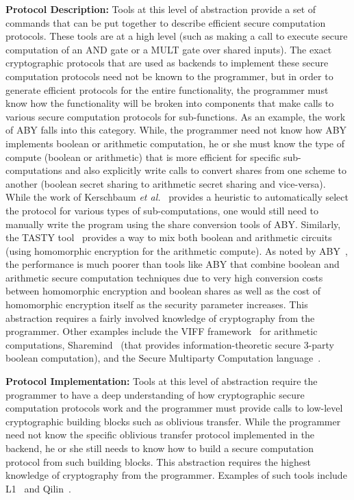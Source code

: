 \begin{tiret}
\item {\bf Protocol Description:} Tools at this level of abstraction provide a set of commands that can be put together to describe efficient secure computation protocols. These tools are at a high level (such as making a call to execute secure computation of an AND gate or a MULT gate over shared inputs). The exact cryptographic protocols that are used as backends to implement these secure computation protocols need not be known to the programmer, but in order to generate efficient protocols for the entire functionality, the programmer must know how the functionality will be broken into components that make calls to various secure computation protocols for sub-functions. As an example, the work of ABY \cite{aby} falls into this category. While, the programmer need not know how ABY implements boolean or arithmetic computation, he or she must know the type of compute (boolean or arithmetic) that is more efficient for specific sub-computations and also explicitly write calls to convert shares from one scheme to another (boolean secret sharing to arithmetic secret sharing and vice-versa). While the work of Kerschbaum {\em et al.}~\cite{kos14} provides a heuristic to automatically select the protocol for various types of sub-computations, one would still need to manually write the program using the share conversion tools of ABY. Similarly, the TASTY tool~\cite{tasty} provides a way to mix both boolean and arithmetic circuits (using homomorphic encryption for the arithmetic compute). As noted by ABY~\cite{aby}, the performance is much poorer than tools like ABY that combine boolean and arithmetic secure computation techniques due to very high conversion costs between homomorphic encryption and boolean shares as well as the cost of homomorphic encryption itself as the security parameter increases. This abstraction requires a fairly involved knowledge of cryptography from the programmer. Other examples include the VIFF framework~\cite{viff} for arithmetic computations, Sharemind~\cite{sharemind} (that provides information-theoretic secure 3-party boolean computation), and the Secure Multiparty Computation language~\cite{nsy04,securemc}. 
\item {\bf Protocol Implementation:} Tools at this level of abstraction require the programmer to have a deep understanding of how cryptographic secure computation protocols work and the programmer must provide calls to low-level cryptographic building blocks such as oblivious transfer. While the programmer need not know the specific oblivious transfer protocol implemented in the backend, he or she still needs to know how to build a secure computation protocol from such building blocks. This abstraction requires the highest knowledge of cryptography from the programmer. Examples of such tools include L1~\cite{l1} and Qilin~\cite{qilin}.
\end{tiret}

